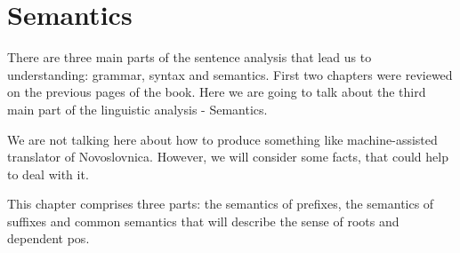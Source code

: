 \chapter{Semantics}

There are three main parts of the sentence analysis that lead us to understanding: grammar, syntax and semantics. First two chapters were reviewed on the previous pages of the book. Here we are going to talk about the third main part of the linguistic analysis - Semantics.

We are not talking here about how to produce something like machine-assisted translator of Novoslovnica. However, we will consider some facts, that could help to deal with it. 

This chapter comprises three parts: the semantics of prefixes, the semantics of suffixes and common semantics that will describe the sense of roots and dependent \gls{pos}.




